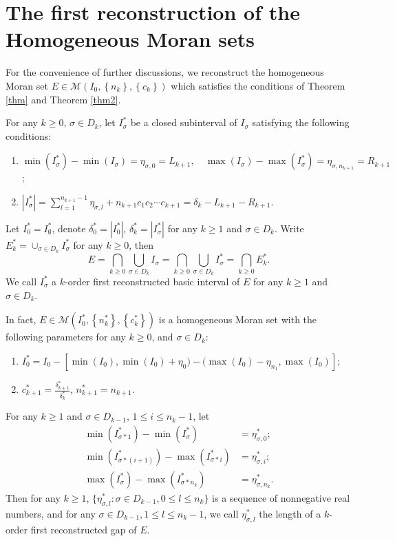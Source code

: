 \documentclass[reqno]{amsart}
\theoremstyle{plain}
\theoremstyle{definition}
\theoremstyle{remark}
\numberwithin{equation}{section} \DeclareMathOperator\intr{int}
\begin{document}
\section{The first reconstruction of the Homogeneous Moran sets}

For the convenience of further discussions, we reconstruct the homogeneous Moran set $E\in \mathcal{M}(I_{0},\left\{n_{k}\right\},\left\{c_{k}\right\})$  which satisfies the conditions of Theorem \ref{thm} and Theorem \ref{thm2}.

For any $k\ge 0$, $\sigma\in D_{k}$, let $I_{\sigma}^{*}$ be a closed subinterval of $I_{\sigma}$ satisfying the following conditions:
\begin{enumerate}
  \item[(a)]$\min(I^{*}_\sigma)-\min(I_\sigma)=\eta_{\sigma,0}=L_{k+1},\quad
            \max(I_\sigma)-\max(I^{*}_\sigma)=\eta_{\sigma,n_{k+1}}=R_{k+1}$;
  \item[(b)]$\left | I^{*}_ {\sigma}\right | =\sum_{l=1}^{n_{k+1}-1} \eta_{\sigma,l}+n_{k+1}c_1c_2\cdots c_{k+1}=\delta_k-L_{k+1}-R_{k+1}$.
\end{enumerate}

 Let $I_{0}^{*}=I_{\emptyset}^{*}$, denote $\delta^*_{0}=\left|I_{0}^{*}\right|$, $\delta^*_{k}=\left|I_{\sigma}^{*}\right|$ for any $ k\ge 1$ and $\sigma\in D_k$. Write $E_{k}^{*}=\cup_{\sigma\in{D_{k}}}I_{\sigma}^{*}$ for any $k\ge 0$, then
\begin{equation}
E=\bigcap_{k\ge 0}\bigcup_{\sigma \in D_k}I_{\sigma}=\bigcap_{k\ge 0}\bigcup_{\sigma \in D_k}I^{*}_{\sigma}=\bigcap_{k\ge 0}E_{k}^{*}.
\end{equation}
We call $I^*_\sigma$ a $k$-order first reconstructed basic interval of $E$ for any $ k\ge 1$ and $\sigma\in D_k$.

In fact, $E\in \mathcal{M}(I_{0}^{*},\left\{n_{k}^{*}\right\},\left\{c_{k}^{*}\right\})$ is a homogeneous Moran set with the following parameters for any $k\ge 0$, and $\sigma \in D_k$:
\begin{enumerate}	\item[\textup{(1)}]$I_{0}^{*}=I_{0}-[\min(I_{0}),\min(I_{0})+\eta_0)-(\max(I_{0})-\eta_{n_1},\max(I_{0})]$;
	\item[\textup{(2)}]$c_{k+1}^{*}=\frac{\delta^*_{k+1}}{\delta^*_{k}}$, $n_{k+1}^{*}=n_{k+1}$.
\end{enumerate}

 For any $k\ge 1$ and $\sigma \in D_{k-1}$,
$1\le i \le n_k-1$, let
\begin{equation}
 \begin{aligned}
     \min(I^{*}_{\sigma*1})-\min(I^{*}_{\sigma})&=\eta^{*}_{\sigma,0};\\
     \min(I^{*}_{\sigma*(i+1)})-\max(I^{*}_{\sigma*i})&=\eta^{*}_{\sigma,i};\\
     \max(I^{*}_{\sigma})-\max(I^{*}_{\sigma*n_k})&=\eta^{*}_{\sigma,n_k}.\nonumber
 \end{aligned}
 \end{equation}
Then for any $k\ge 1$, $\{\eta^{*}_{\sigma,l}:\sigma \in D_{k-1}, 0\le l \le n_k\}$ is a sequence of nonnegative real numbers,  and for any  $\sigma \in D_{k-1}, 1\le l \le n_k-1$, we call $\eta^{*}_{\sigma,l}$ the length of a $k$-order  first reconstructed gap of $E$.
\end{document}
